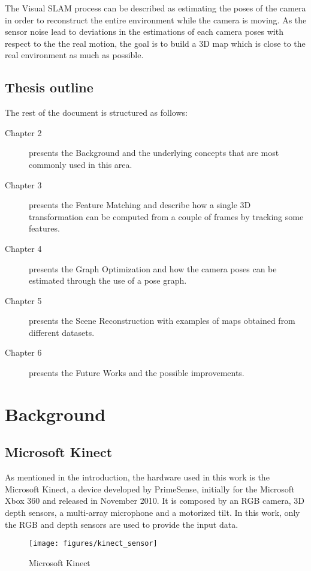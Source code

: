 The Visual SLAM process can be described as estimating the poses of the camera in order to reconstruct the entire environment while the camera is moving. As the sensor noise lead to deviations in the estimations of each camera poses with respect to the the real motion, the goal is to build a 3D map which is close to the real environment as much as possible.

\section{Thesis outline}
The rest of the document is structured as follows:
\begin{description}
\item[Chapter 2] presents the Background and the underlying concepts that are most commonly used in this area.
\item[Chapter 3] presents the Feature Matching and describe how a single 3D transformation can be computed  from a couple of frames by tracking some features.
\item[Chapter 4] presents the Graph Optimization and how the camera poses can be estimated through the use of a pose graph.
\item[Chapter 5] presents the Scene Reconstruction with examples of maps obtained from different datasets.
\item[Chapter 6] presents the Future Works and the possible improvements.
\end{description}

\chapter{Background}

\section{Microsoft Kinect}

As mentioned in the introduction, the hardware used in this work is the Microsoft Kinect, a device developed by PrimeSense, initially for the Microsoft Xbox 360 and released in November 2010. It is composed by an RGB camera, 3D depth sensors, a multi-array microphone and a motorized tilt. In this work, only the RGB and depth sensors are used to provide the input data.

\begin{figure}[h]
\centering
\texttt{[image: figures/kinect\_sensor]}
\caption{Microsoft Kinect}
\end{figure}

